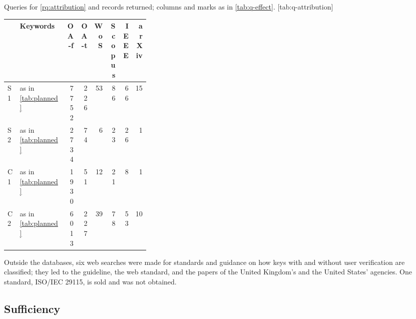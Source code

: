 \begin{table}[h]
  \begin{sidecaption}{%
    Queries for \cref{rq:attribution} and records returned; columns and
    marks as in \cref{tab:q-effect}.
  }[tab:q-attribution]
    \footnotesize
    \begin{tabular}{@{}lL{0.33\linewidth}rrrrrr@{}}
      \toprule
      & Keywords & OA-f & OA-t & WoS & Scopus & IEEE & arXiv \\
      \midrule
      S1 & as in \cref{tab:planned} & 7752 & 226 & 53 & 86 & 66 & 15 \\
      S2 & as in \cref{tab:planned} & 2734 & 74 & 6 & 23 & 26 & 1 \\
      C1 & as in \cref{tab:planned} & 1930 & 51 & 12 & 21 & 8 & 1 \\
      C2 & as in \cref{tab:planned} & 6013 & 227 & 39 & 78 & 53 & 10 \\
      \bottomrule
    \end{tabular}
  \end{sidecaption}
\end{table}
Outside the databases, six web searches were made for standards and
guidance on how keys with and without user verification are classified;
they led to the guideline, the web standard, and the papers of the
United Kingdom's and the United States' agencies.
One standard, ISO/IEC 29115, is sold and was not obtained.



\clearpage
\subsection{Sufficiency}

